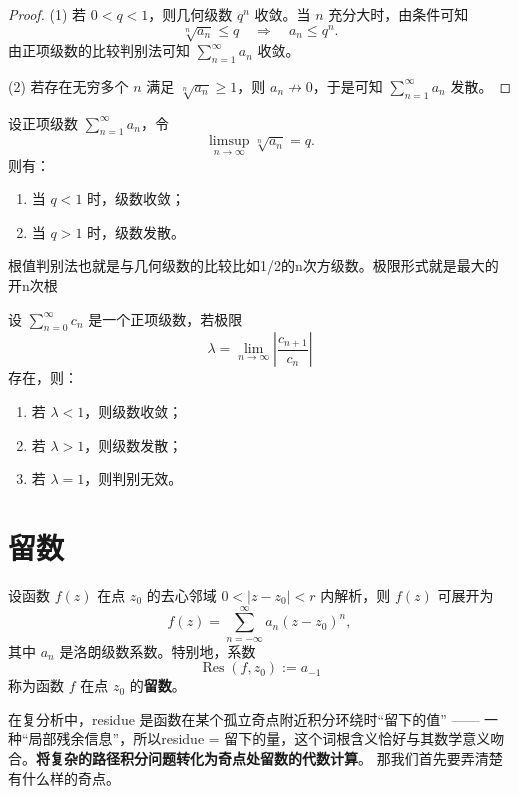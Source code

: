 \documentclass[lang=cn,10pt]{elegantbook}
\begin{document}
\begin{proof}
(1) 若 $0 < q < 1$，则几何级数 $q^n$ 收敛。当 $n$ 充分大时，由条件可知
\[
\sqrt[n]{a_n} \leq q \quad \Longrightarrow \quad a_n \leq q^n.
\]
由正项级数的比较判别法可知 $\sum_{n=1}^{\infty} a_n$ 收敛。

(2) 若存在无穷多个 $n$ 满足 $\sqrt[n]{a_n} \geq 1$，则 $a_n \not\to 0$，于是可知 $\sum_{n=1}^{\infty} a_n$ 发散。
\end{proof}

\begin{theorem}[柯西根值判别法的极限形式]
设正项级数 $\sum_{n=1}^{\infty} a_n$，令
\[
\limsup_{n \to \infty} \sqrt[n]{a_n} = q.
\]
则有：
\begin{enumerate}
  \item 当 $q < 1$ 时，级数收敛；
  \item 当 $q > 1$ 时，级数发散。
\end{enumerate}
\end{theorem}
根值判别法也就是与几何级数的比较比如1/2的n次方级数。极限形式就是最大的开n次根
\begin{theorem}[达朗贝尔判别法]
设 $\sum_{n=0}^{\infty} c_n$ 是一个正项级数，若极限
\[
\lambda = \lim_{n \to \infty} \left| \frac{c_{n+1}}{c_n} \right|
\]
存在，则：
\begin{enumerate}
  \item 若 $\lambda < 1$，则级数收敛；
  \item 若 $\lambda > 1$，则级数发散；
  \item 若 $\lambda = 1$，则判别无效。
\end{enumerate}
\end{theorem}

\chapter{留数}
\begin{definition}[留数]
设函数 $f(z)$ 在点 $z_0$ 的去心邻域 $0<|z-z_0|<r$ 内解析，则 $f(z)$ 可展开为
\[
f(z) = \sum_{n=-\infty}^{\infty} a_n (z-z_0)^n,
\]
其中 $a_n$ 是洛朗级数系数。特别地，系数
\[
\operatorname{Res}(f, z_0) := a_{-1}
\]
称为函数 $f$ 在点 $z_0$ 的\textbf{留数}。
\end{definition}

在复分析中，residue 是函数在某个孤立奇点附近积分环绕时“留下的值” —— 一种“局部残余信息”，所以residue = 留下的量，这个词根含义恰好与其数学意义吻合。\textbf{将复杂的路径积分问题转化为奇点处留数的代数计算}。
那我们首先要弄清楚有什么样的奇点。
\end{document}
